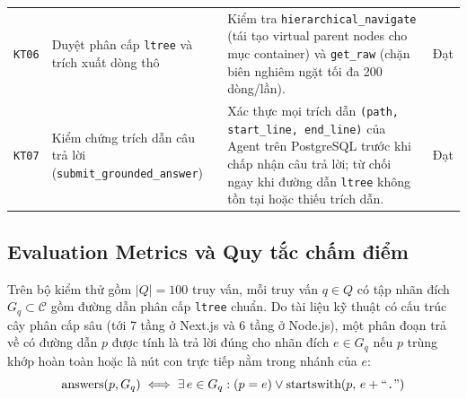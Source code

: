 \begin{table}[H]
\begin{tabularx}{\textwidth}{c>{\raggedright\arraybackslash}p{4.3cm}>{\raggedright\arraybackslash}Xc}
\addlinespace[2pt]
\texttt{KT06} & Duyệt phân cấp \texttt{ltree} và trích xuất dòng thô & Kiểm tra \texttt{hierarchical\_navigate} (tái tạo virtual parent nodes cho mục container) và \texttt{get\_raw} (chặn biên nghiêm ngặt tối đa 200 dòng/lần). & Đạt \\
\addlinespace[2pt]
\texttt{KT07} & Kiểm chứng trích dẫn câu trả lời (\texttt{submit\_grounded\_answer}) & Xác thực mọi trích dẫn \texttt{(path, start\_line, end\_line)} của Agent trên PostgreSQL trước khi chấp nhận câu trả lời; từ chối ngay khi đường dẫn \texttt{ltree} không tồn tại hoặc thiếu trích dẫn. & Đạt \\
\bottomrule
\end{tabularx}
\end{table}

\subsection{Evaluation Metrics và Quy tắc chấm điểm}
Trên bộ kiểm thử gồm $|Q| = 100$ truy vấn, mỗi truy vấn $q \in Q$ có tập nhãn đích $G_q \subset \mathcal{C}$ gồm đường dẫn phân cấp \texttt{ltree} chuẩn. Do tài liệu kỹ thuật có cấu trúc cây phân cấp sâu (tới 7 tầng ở Next.js và 6 tầng ở Node.js), một phân đoạn trả về có đường dẫn $p$ được tính là trả lời đúng cho nhãn đích $e \in G_q$ nếu $p$ trùng khớp hoàn toàn hoặc là nút con trực tiếp nằm trong nhánh của $e$:
\begin{equation}
    \text{answers}(p, G_q) \iff \exists\, e \in G_q : (p = e) \lor \text{startswith}(p,\, e + \text{``\texttt{.}''})
    \label{eq:ltree_match}
\end{equation}

